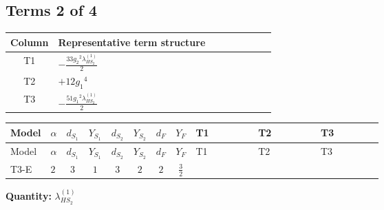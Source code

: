 \documentclass[8pt]{article}
\begin{document}
\begin{landscape}
\subsection*{Terms 2 of 4}
\begin{center}
\begin{tabular}{@{}c >{\raggedright\arraybackslash}p{0.82\linewidth}@{}}
\toprule
Column & Representative term structure \\
\midrule
T1 & \(\displaystyle -\frac{33 {g_2}^2 {\lambda_{HS_2}^{(1)}}}{2}\) \\
\midrule
T2 & \(\displaystyle +12 {g_1}^4\) \\
\midrule
T3 & \(\displaystyle -\frac{51 {g_1}^2 {\lambda_{HS_2}^{(1)}}}{2}\) \\
\midrule
\bottomrule
\end{tabular}
\end{center}
\smallskip
\tiny
\begin{longtable}{@{}llcccccc >{\raggedright\arraybackslash}p{0.21\linewidth} >{\raggedright\arraybackslash}p{0.21\linewidth} >{\raggedright\arraybackslash}p{0.21\linewidth}@{}}
\toprule
Model & $\alpha$ & $d_{S_1}$ & $Y_{S_1}$ & $d_{S_2}$ & $Y_{S_2}$ & $d_F$ & $Y_F$ & T1 & T2 & T3 \\
\midrule
\endfirsthead
\toprule
Model & $\alpha$ & $d_{S_1}$ & $Y_{S_1}$ & $d_{S_2}$ & $Y_{S_2}$ & $d_F$ & $Y_F$ & T1 & T2 & T3 \\
\midrule
\endhead
T3-E & $2$ & $3$ & $1$ & $3$ & $2$ & $2$ & $\frac{3}{2}$ & \scriptsize\adjustbox{max width=\linewidth}{$\begin{gathered} -\frac{33 {g_2}^2 {\lambda_{HS_2}^{(1)}}}{2}\end{gathered}$} & \scriptsize\adjustbox{max width=\linewidth}{$\begin{gathered} +12 {g_1}^4\end{gathered}$} & \scriptsize\adjustbox{max width=\linewidth}{$\begin{gathered} -\frac{51 {g_1}^2 {\lambda_{HS_2}^{(1)}}}{2}\end{gathered}$} \\
\midrule
\bottomrule
\end{longtable}
\clearpage
\noindent\textbf{Quantity: }$\lambda_{HS_2}^{(1)}$\par\smallskip

\end{landscape}
\end{document}
